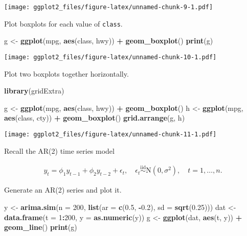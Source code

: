 \documentclass[]{article}
\newenvironment{Shaded}{\begin{snugshade}}{\end{snugshade}}
\newcommand{\KeywordTok}[1]{\textcolor[rgb]{0.13,0.29,0.53}{\textbf{#1}}}
\newcommand{\DataTypeTok}[1]{\textcolor[rgb]{0.13,0.29,0.53}{#1}}
\newcommand{\DecValTok}[1]{\textcolor[rgb]{0.00,0.00,0.81}{#1}}
\newcommand{\FloatTok}[1]{\textcolor[rgb]{0.00,0.00,0.81}{#1}}
\newcommand{\StringTok}[1]{\textcolor[rgb]{0.31,0.60,0.02}{#1}}
\newcommand{\OperatorTok}[1]{\textcolor[rgb]{0.81,0.36,0.00}{\textbf{#1}}}
\newcommand{\NormalTok}[1]{#1}
\begin{document}
\texttt{[image: ggplot2\_files/figure-latex/unnamed-chunk-9-1.pdf]}

Plot boxplots for each value of \texttt{class}.

\begin{Shaded}
\begin{Highlighting}[]
\NormalTok{g <-}\StringTok{ }\KeywordTok{ggplot}\NormalTok{(mpg, }\KeywordTok{aes}\NormalTok{(class, hwy)) }\OperatorTok{+}
\StringTok{    }\KeywordTok{geom_boxplot}\NormalTok{()}
\KeywordTok{print}\NormalTok{(g)}
\end{Highlighting}
\end{Shaded}

\texttt{[image: ggplot2\_files/figure-latex/unnamed-chunk-10-1.pdf]}

Plot two boxplots together horizontally.

\begin{Shaded}
\begin{Highlighting}[]
\KeywordTok{library}\NormalTok{(gridExtra)}

\NormalTok{g <-}\StringTok{ }\KeywordTok{ggplot}\NormalTok{(mpg, }\KeywordTok{aes}\NormalTok{(class, hwy)) }\OperatorTok{+}
\StringTok{    }\KeywordTok{geom_boxplot}\NormalTok{()}
\NormalTok{h <-}\StringTok{ }\KeywordTok{ggplot}\NormalTok{(mpg, }\KeywordTok{aes}\NormalTok{(class, cty)) }\OperatorTok{+}
\StringTok{    }\KeywordTok{geom_boxplot}\NormalTok{()}
\KeywordTok{grid.arrange}\NormalTok{(g, h)}
\end{Highlighting}
\end{Shaded}

\texttt{[image: ggplot2\_files/figure-latex/unnamed-chunk-11-1.pdf]}

Recall the AR(2) time series model

\begin{align*}
y_t = \phi_1 y_{t-1} + \phi_2 y_{t-2} + \epsilon_t, \quad
\epsilon_t \stackrel{\text{iid}}{\sim} \text{N}(0, \sigma^2),
\quad t = 1, \ldots, n.
\end{align*}

Generate an AR(2) series and plot it.

\begin{Shaded}
\begin{Highlighting}[]
\NormalTok{y <-}\StringTok{ }\KeywordTok{arima.sim}\NormalTok{(}\DataTypeTok{n =} \DecValTok{200}\NormalTok{, }\KeywordTok{list}\NormalTok{(}\DataTypeTok{ar =} \KeywordTok{c}\NormalTok{(}\FloatTok{0.5}\NormalTok{, }\OperatorTok{-}\FloatTok{0.2}\NormalTok{), }\DataTypeTok{sd =} \KeywordTok{sqrt}\NormalTok{(}\FloatTok{0.25}\NormalTok{)))}
\NormalTok{dat <-}\StringTok{ }\KeywordTok{data.frame}\NormalTok{(}\DataTypeTok{t =} \DecValTok{1}\OperatorTok{:}\DecValTok{200}\NormalTok{, }\DataTypeTok{y =} \KeywordTok{as.numeric}\NormalTok{(y))}
\NormalTok{g <-}\StringTok{ }\KeywordTok{ggplot}\NormalTok{(dat, }\KeywordTok{aes}\NormalTok{(t, y)) }\OperatorTok{+}\StringTok{ }\KeywordTok{geom_line}\NormalTok{()}
\KeywordTok{print}\NormalTok{(g)}
\end{Highlighting}
\end{Shaded}
\end{document}
